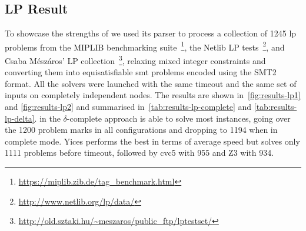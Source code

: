 \documentclass[runningheads]{llncs}
\begin{document}
\subsection*{LP Result}

To showcase the strengths of \dlinear we used its parser to process a collection of 1245 \gls{lp} problems from the MIPLIB benchmarking suite~\footnote{\url{https://miplib.zib.de/tag_benchmark.html}}, the Netlib LP tests~\footnote{\url{http://www.netlib.org/lp/data/}}, and Csaba Mészáros' LP collection~\footnote{\url{http://old.sztaki.hu/~meszaros/public_ftp/lptestset/}}, relaxing mixed integer constraints and converting them into equisatisfiable \gls{smt} problems encoded using the SMT2 format.
All the solvers were launched with the same timeout and the same set of inputs on completely independent nodes.
The results are shown in~\autoref{fig:results-lp1} and \autoref{fig:results-lp2} and summarised in~\autoref{tab:results-lp-complete} and \autoref{tab:results-lp-delta}.
\dlinear in the $\delta$-complete approach is able to solve most instances, going over the 1200 problem marks in all configurations and dropping to 1194 when in complete mode.
Yices performs the best in terms of average speed but solves only 1111 problems before timeout, followed by cvc5 with 955 and Z3 with 934.
\end{document}
